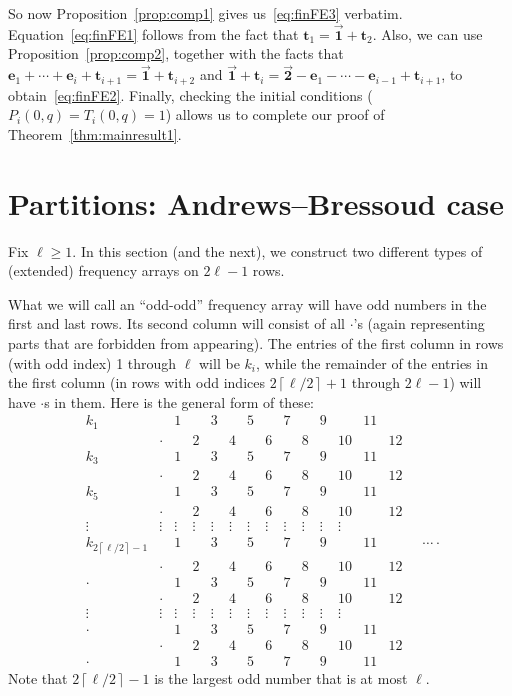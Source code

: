 \documentclass[pdftex]{sigma}
\numberwithin{equation}{section}
\theoremstyle{definition}
\newcommand{\tr}{\mathbf{t}}
\newcommand{\ee}{\mathbf{e}}
\newcommand{\two}{\vec{\mathbf{2}}}
\newcommand{\one}{\vec{\mathbf{1}}}
\begin{document}
So now Proposition~\ref{prop:comp1} gives us~\eqref{eq:finFE3} verbatim. Equation~\eqref{eq:finFE1} follows from the fact that $\tr_1=\one+\tr_2$. Also, we can use Proposition~\ref{prop:comp2}, together with the facts that $\ee_1+\cdots+\ee_{i}+\tr_{i+1} = \one+\tr_{i+2}$ and $\one+\tr_{i} =\two-\ee_1-\cdots-\ee_{i-1}+\tr_{i+1}$, to obtain~\eqref{eq:finFE2}. Finally, checking the initial conditions ($P_i(0,q)=T_i(0,q)=1$) allows us to complete our proof of Theorem~\ref{thm:mainresult1}.

\section{Partitions: Andrews--Bressoud case}\label{sec:partitions4}

Fix $\ell\ge1$. In this section (and the next), we construct two different types of (extended) frequency arrays on $2\ell-1$ rows.

What we will call an ``odd-odd'' frequency array will have odd numbers in the first and last rows. Its second column will consist of all $\cdot$'s (again representing parts that are forbidden from appearing). The entries of the first column in rows (with odd index) 1 through $\ell$ will be $k_i$, while the remainder of the entries in the first column (in rows with odd indices $2\left\lceil \ell/2\right\rceil+1$ through $2\ell-1$) will have $\cdot$s in them. Here is the general form of these:
\begin{equation*}
\begin{matrix}
k_1 && 1 && 3 && 5 && 7 && 9 && 11 & \\
& \cdot && 2 && 4 && 6 && 8 && 10 && 12\\
k_3 && 1 && 3 && 5 && 7 && 9 && 11 & \\
& \cdot && 2 && 4 && 6 && 8 && 10 && 12\\
k_5 && 1 && 3 && 5 && 7 && 9 && 11 & \\
& \cdot && 2 && 4 && 6 && 8 && 10 && 12\\
\vdots & \vdots &\vdots& \vdots &\vdots& \vdots &\vdots& \vdots &\vdots& \vdots &\vdots& \vdots\\
k_{2\left\lceil \ell/2\right\rceil-1} && 1 && 3 && 5 && 7 && 9 && 11 & \\
& \cdot && 2 && 4 && 6 && 8 && 10 && 12\\
\cdot && 1 && 3 && 5 && 7 && 9 && 11 & \\
& \cdot && 2 && 4 && 6 && 8 && 10 && 12\\
\vdots & \vdots &\vdots& \vdots &\vdots& \vdots &\vdots& \vdots &\vdots& \vdots &\vdots& \vdots\\
\cdot && 1 && 3 && 5 && 7 && 9 && 11 & \\
& \cdot && 2 && 4 && 6 && 8 && 10 && 12 \\
\cdot && 1 && 3 && 5 && 7 && 9 && 11 &
 \end{matrix}\quad\dots \,.
\end{equation*}
Note that $2\left\lceil \ell/2\right\rceil-1$ is the largest odd number that is at most $\ell$.
\end{document}
